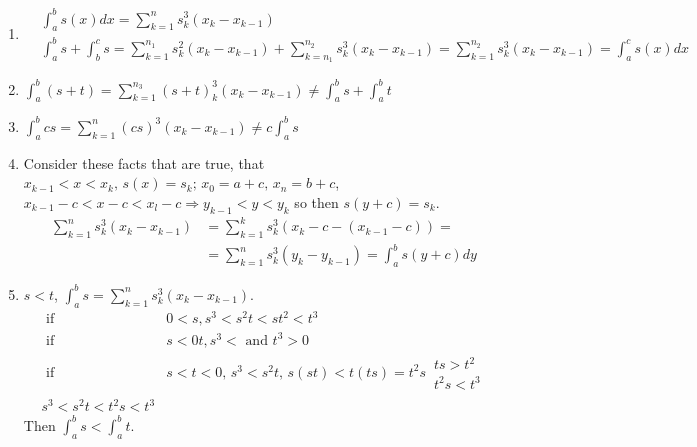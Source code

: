 \documentclass[twoside]{amsart}
\theoremstyle{plain}
\theoremstyle{definition}
\newcommand{\exercisehead}[1]
  {\smallskip
   \noindent{\small\bf Exercise #1.}}
\begin{document}
\exercisehead{11} 
\begin{enumerate} 
\item 
\[
\begin{aligned}
  & \int_a^b s(x) dx = \sum_{k=1}^n s_k^3 (x_k - x_{k-1}) \\
  & \int_a^b s + \int_b^c s = \sum_{k=1}^{n_1} s_k^2 (x_k-x_{k-1}) + \sum_{k=n_1}^{n_2} s_k^3 (x_k -x_{k-1}) = \sum_{k=1}^{n_2} s_k^3 (x_k - x_{k-1}) = \int_a^c s(x) dx 
\end{aligned}
\]
\item $\int_a^b (s+t) = \sum_{k=1}^{n_3} (s+t)_k^3 (x_k - x_{k-1}) \neq \int_a^b s + \int_a^b t $
\item $ \int_a^b cs = \sum_{k=1}^n (cs)^3 (x_k -x_{k-1}) \neq c \int_a^b s$
\item Consider these facts that are true, that $x_{k-1} < x < x_k, \, s(x) = s_k; \, x_0 = a+c, \, x_n = b+c$, \\ 
  $x_{k-1} - c < x - c < x_l -c \Longrightarrow y_{k-1} < y < y_k$ so then $s(y+c) = s_k$.  
\[
\begin{aligned}
  \sum_{k=1}^n s_k^3 (x_k - x_{k-1}) & = \sum_{k=1}^k s_k^3 (x_k - c -(x_{k-1} -c)) = \\
  & = \sum_{k=1}^n s_k^3 (y_k - y_{k-1}) = \int_a^b s(y+c) dy
\end{aligned}
\]
\item $s<t$, $\int_a^b s = \sum_{k=1}^n s_k^3 (x_k -x_{k-1})$.  
\[
\begin{aligned}
\text{ if } & 0 <s , s^3 < s^2 t < st^2 < t^3   \\
\text{ if } & s< 0 t , s^3 < \text{ and } t^3 > 0 \\ 
\text{ if } & s<t< 0, \, s^3 < s^2 t , \, s(st) < t(ts) = t^2 s \, \begin{gathered} ts > t^2 \\ t^2 s < t^3 \end{gathered} \\
s^3 < s^2 t < t^2 s < t^3 
\end{aligned}
\]
Then $\int_a^b s < \int_a^b t$.  
\end{enumerate}
\end{document}
